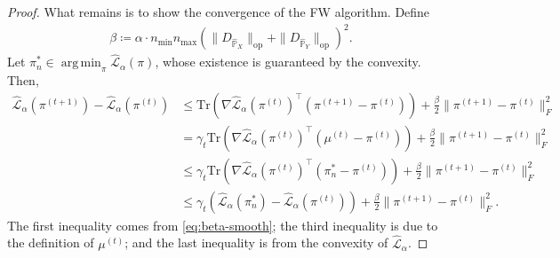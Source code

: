 \documentclass{article}
\theoremstyle{plain}
\theoremstyle{definition}
\theoremstyle{remark}
\DeclareMathOperator*{\argmin}{arg\,min}
\begin{document}
\begin{proof}
	What remains is to show the convergence of the FW algorithm. Define
	\begin{align*}
		\beta \coloneqq \alpha \cdot n_{\min}n_{\max} \left(\|D_{\hat{\mathbb{P}}_X}\|_{\mathrm{op}} + \|D_{\hat{\mathbb{P}}_Y}\|_{\mathrm{op}}\right)^2 .
	\end{align*}
	Let $\pi_n^\ast \in \argmin_{\pi} \hat{\mathcal{L}}_{\alpha}(\pi)$, whose existence is guaranteed by the convexity. Then,
	\begin{align*}
		\hat{\mathcal{L}}_{\alpha}(\pi^{(t+1)}) - \hat{\mathcal{L}}_{\alpha}(\pi^{(t)}) &\leq \mathrm{Tr}\left(\nabla \hat{\mathcal{L}}_{\alpha}(\pi^{(t)})^\top (\pi^{(t+1)} - \pi^{(t)})\right) + \frac{\beta}{2} \|\pi^{(t+1)} - \pi^{(t)} \|_F^2 \\
		&= \gamma_t\mathrm{Tr}\left(\nabla \hat{\mathcal{L}}_{\alpha}(\pi^{(t)})^\top (\mu^{(t)} - \pi^{(t)})\right) + \frac{\beta}{2} \|\pi^{(t+1)} - \pi^{(t)} \|_F^2 \\
		&\leq \gamma_t \mathrm{Tr}\left(\nabla \hat{\mathcal{L}}_{\alpha}(\pi^{(t)})^\top (\pi_n^\ast - \pi^{(t)})\right) + \frac{\beta}{2} \|\pi^{(t+1)} - \pi^{(t)} \|_F^2 \\
		&\leq \gamma_t \left(\hat{\mathcal{L}}_{\alpha}(\pi_n^*) - \hat{\mathcal{L}}_{\alpha}(\pi^{(t)})\right) + \frac{\beta}{2} \|\pi^{(t+1)} - \pi^{(t)} \|_F^2 .
	\end{align*}
	The first inequality comes from \eqref{eq:beta-smooth}; the third inequality is due to the definition of $\mu^{(t)}$; and the last inequality is from the convexity of $\hat{\mathcal{L}}_{\alpha}$. 
	

\end{proof}
\end{document}

